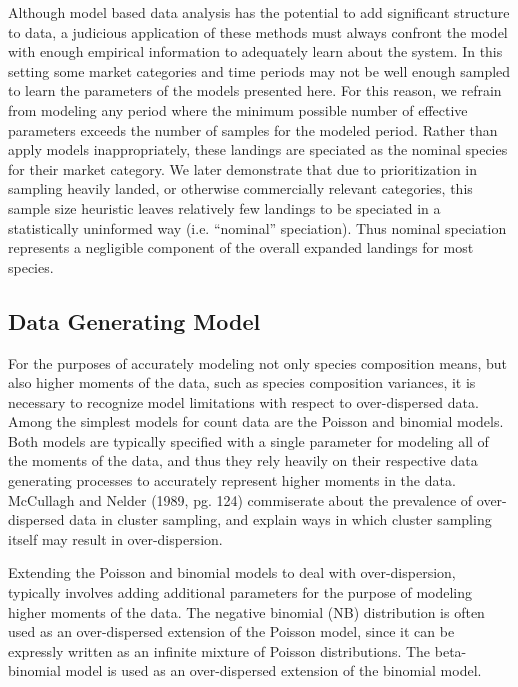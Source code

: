 \documentclass[12pt]{article}
\begin{document}
Although model based data analysis has the potential to add significant
structure to data, a judicious application of these methods must always
confront the model with enough empirical information to adequately learn
about the system. In this setting some market categories and time
periods may not be well enough sampled to learn the parameters of the
models presented here. For this reason, we refrain from modeling any
period where the minimum possible number of effective parameters exceeds
the number of samples for the modeled period. Rather than apply models
inappropriately, these landings are speciated as the nominal species for
their market category. We later demonstrate that due to prioritization
in sampling heavily landed, or otherwise commercially relevant
categories, this sample size heuristic leaves relatively few landings to
be speciated in a statistically uninformed way (i.e. ``nominal''
speciation). Thus nominal speciation represents a negligible component
of the overall expanded landings for most species.

\subsection{Data Generating Model}\label{data-generating-model}

For the purposes of accurately modeling not only species composition
means, but also higher moments of the data, such as species composition
variances, it is necessary to recognize model limitations with respect
to over-dispersed data. Among the simplest models for count data are the
Poisson and binomial models. Both models are typically specified with a
single parameter for modeling all of the moments of the data, and thus
they rely heavily on their respective data generating processes to
accurately represent higher moments in the data. McCullagh and Nelder
(1989, pg. 124) commiserate about the prevalence of over-dispersed data
in cluster sampling, and explain ways in which cluster sampling itself
may result in over-dispersion.

Extending the Poisson and binomial models to deal with over-dispersion,
typically involves adding additional parameters for the purpose of
modeling higher moments of the data. The negative binomial (NB)
distribution is often used as an over-dispersed extension of the Poisson
model, since it can be expressly written as an infinite mixture of
Poisson distributions. The beta-binomial model is used as an
over-dispersed extension of the binomial model.
\end{document}

